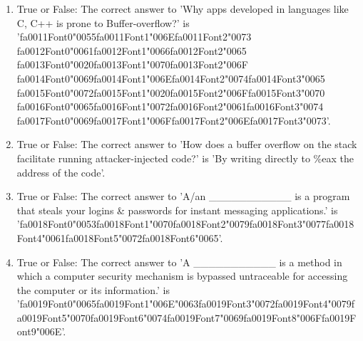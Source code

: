 \documentclass[12pt]{article}
\begin{document}
\begin{enumerate}[label=\arabic*.]
\item True or False: The correct answer to 'Why apps developed in languages like C, C++ is prone to Buffer-overflow?' is '{\csname fa0011Font0\endcsname\char"0055}{\csname fa0011Font1\endcsname\char"006E}{\csname fa0011Font2\endcsname\char"0073} {\csname fa0012Font0\endcsname\char"0061}{\csname fa0012Font1\endcsname\char"0066}{\csname fa0012Font2\endcsname\char"0065} {\csname fa0013Font0\endcsname\char"0020}{\csname fa0013Font1\endcsname\char"0070}{\csname fa0013Font2\endcsname\char"006F} {\csname fa0014Font0\endcsname\char"0069}{\csname fa0014Font1\endcsname\char"006E}{\csname fa0014Font2\endcsname\char"0074}{\csname fa0014Font3\endcsname\char"0065} {\csname fa0015Font0\endcsname\char"0072}{\csname fa0015Font1\endcsname\char"0020}{\csname fa0015Font2\endcsname\char"006F}{\csname fa0015Font3\endcsname\char"0070} {\csname fa0016Font0\endcsname\char"0065}{\csname fa0016Font1\endcsname\char"0072}{\csname fa0016Font2\endcsname\char"0061}{\csname fa0016Font3\endcsname\char"0074} {\csname fa0017Font0\endcsname\char"0069}{\csname fa0017Font1\endcsname\char"006F}{\csname fa0017Font2\endcsname\char"006E}{\csname fa0017Font3\endcsname\char"0073}'.
\item True or False: The correct answer to 'How does a buffer overflow on the stack facilitate running attacker-injected code?' is 'By writing directly to \%eax the address of the code'.
\item True or False: The correct answer to 'A/an \_\_\_\_\_\_\_\_\_\_\_ is a program that steals your logins \& passwords for instant messaging applications.' is '{\csname fa0018Font0\endcsname\char"0053}{\csname fa0018Font1\endcsname\char"0070}{\csname fa0018Font2\endcsname\char"0079}{\csname fa0018Font3\endcsname\char"0077}{\csname fa0018Font4\endcsname\char"0061}{\csname fa0018Font5\endcsname\char"0072}{\csname fa0018Font6\endcsname\char"0065}'.
\item True or False: The correct answer to 'A \_\_\_\_\_\_\_\_\_\_\_ is a method in which a computer security mechanism is bypassed untraceable for accessing the computer or its information.' is '{\csname fa0019Font0\endcsname\char"0065}{\csname fa0019Font1\endcsname\char"006E}{\char"0063}{\csname fa0019Font3\endcsname\char"0072}{\csname fa0019Font4\endcsname\char"0079}{\csname fa0019Font5\endcsname\char"0070}{\csname fa0019Font6\endcsname\char"0074}{\csname fa0019Font7\endcsname\char"0069}{\csname fa0019Font8\endcsname\char"006F}{\csname fa0019Font9\endcsname\char"006E}'.

\end{enumerate}
\end{document}
